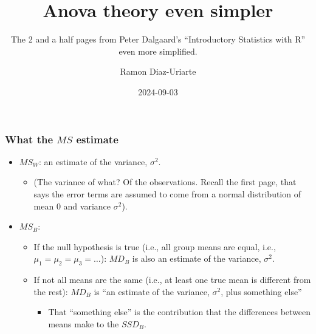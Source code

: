 \documentclass[bigger]{beamer}
\author{Ramon Diaz-Uriarte}
\date{2024-09-03}
\title{Anova theory even simpler}
\subtitle{The 2 and a half pages from Peter Dalgaard's ``Introductory Statistics with R'' even more simplified.}
\begin{document}
 \maketitle







\begin{frame}
  \frametitle{What the $MS$ estimate}
  \begin{itemize}
  \item $MS_W$: an estimate of the variance, $\sigma^2$.
    \begin{itemize}
    \item {\tiny (The variance of what? Of the observations. Recall the
        first page, that says the error terms are assumed to come from a normal
        distribution of mean 0 and variance $\sigma^2$).}
    \end{itemize}

    \vspace*{20pt}
  \item $MS_B$:
    \begin{itemize}
    \item If the null hypothesis is true (i.e., all group means are equal, i.e.,
      $\mu_1 = \mu_2 = \mu_3 = \ldots$): $MD_B$ is also an estimate of the variance,
      $\sigma^2$.
          \vspace*{10pt}
    \item If not all means are the same (i.e., at least one true mean is
      different from the rest):  $MD_B$ is ``an estimate of the
      variance, $\sigma^2$, plus something else''
      \begin{itemize}
      \item That ``something else'' is the contribution that the differences
        between means make to the $SSD_B$.
      \end{itemize}
    \end{itemize}
  \end{itemize}
\end{frame}
\end{document}
